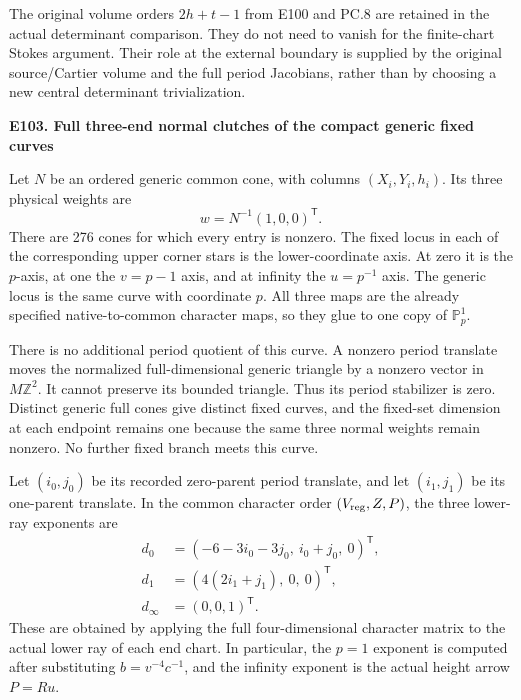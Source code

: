 The original volume orders \(2h+t-1\) from E100 and PC.8 are retained in the actual determinant comparison. They do not need to vanish for the finite-chart Stokes argument. Their role at the external boundary is supplied by the original source/Cartier volume and the full period Jacobians, rather than by choosing a new central determinant trivialization.

\par

\medskip\noindent\textbf{E103. Full three-end normal clutches of the compact generic fixed curves}

\par\nobreak

Let \(N\) be an ordered generic common cone, with columns
\((X_i,Y_i,h_i)\). Its three physical weights are
\[
                        w=N^{-1}(1,0,0)^{\mathsf T}.
\]
There are 276 cones for which every entry is nonzero. The fixed locus in each of the corresponding upper corner stars is the lower-coordinate axis. At zero it is the \(p\)-axis, at one the \(v=p-1\) axis, and at infinity the \(u=p^{-1}\) axis. The generic locus is the same curve with coordinate \(p\). All three maps are the already specified native-to-common character maps, so they glue to one copy of \(\mathbb P^1_p\).

There is no additional period quotient of this curve. A nonzero period translate moves the normalized full-dimensional generic triangle by a nonzero vector in \(M\mathbb Z^2\). It cannot preserve its bounded triangle. Thus its period stabilizer is zero. Distinct generic full cones give distinct fixed curves, and the fixed-set dimension at each endpoint remains one because the same three normal weights remain nonzero. No further fixed branch meets this curve.

Let \((i_0,j_0)\) be its recorded zero-parent period translate, and let \((i_1,j_1)\) be its one-parent translate. In the common character order \((V_{\rm reg},Z,P)\), the three lower-ray exponents are
\[
 \begin{aligned}
 d_0&=(-6-3i_0-3j_0,\ i_0+j_0,\ 0)^{\mathsf T},\\
 d_1&=(4(2i_1+j_1),\ 0,\ 0)^{\mathsf T},\\
 d_\infty&=(0,0,1)^{\mathsf T}.
 \end{aligned}
 \tag{E103.1}
\]
These are obtained by applying the full four-dimensional character matrix to the actual lower ray of each end chart. In particular, the \(p=1\) exponent is computed after substituting \(b=v^{-4}c^{-1}\), and the infinity exponent is the actual height arrow \(P=Ru\).

